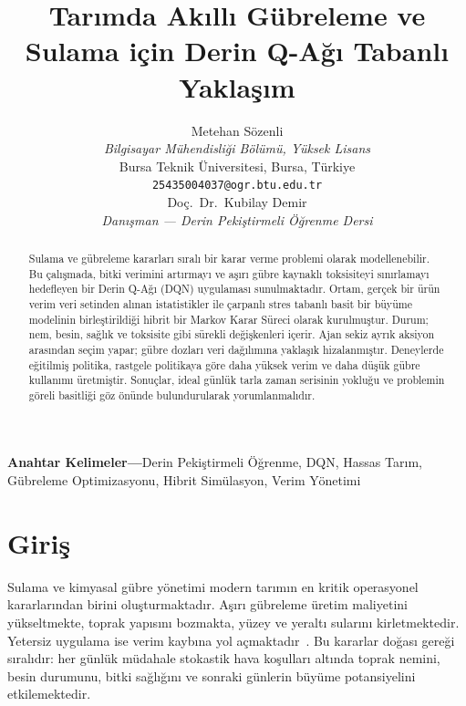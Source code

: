 \documentclass[10pt,twocolumn,a4paper]{article}
\begin{document}
\title{\vspace{-0.6em}\textbf{Tar{\i}mda Ak{\i}ll{\i} G\"ubreleme ve Sulama i\c{c}in Derin Q-A\u{g}{\i} Tabanl{\i} Yakla\c{s}{\i}m}}

\author{
Metehan S\"ozenli\\
\textit{Bilgisayar M\"uhendisli\u{g}i B\"ol\"um\"u, Y\"uksek Lisans}\\
Bursa Teknik \"Universitesi, Bursa, T\"urkiye\\
\texttt{25435004037@ogr.btu.edu.tr}\\[0.35em]
Do\c{c}.~Dr.~Kubilay Demir\\
\textit{Dan{\i}\c{s}man --- Derin Peki\c{s}tirmeli \"O\u{g}renme Dersi}
}

\date{}
\maketitle
\thispagestyle{fancy}

\begin{abstract}
\noindent
Sulama ve g\"ubreleme kararlar{\i} s{\i}ral{\i} bir karar verme problemi olarak modellenebilir. Bu \c{c}al{\i}\c{s}mada, bitki verimini art{\i}rmay{\i} ve a\c{s}{\i}r{\i} g\"ubre kaynakl{\i} toksisiteyi s{\i}n{\i}rlamay{\i} hedefleyen bir Derin Q-A\u{g}{\i} (DQN) uygulamas{\i} sunulmaktad{\i}r. Ortam, ger\c{c}ek bir \"ur\"un verim veri setinden al{\i}nan istatistikler ile \c{c}arpanl{\i} stres tabanl{\i} basit bir b\"uy\"ume modelinin birle\c{s}tirildi\u{g}i hibrit bir Markov Karar S\"ureci olarak kurulmu\c{s}tur. Durum; nem, besin, sa\u{g}l{\i}k ve toksisite gibi s\"urekli de\u{g}i\c{s}kenleri i\c{c}erir. Ajan sekiz ayr{\i}k aksiyon aras{\i}ndan se\c{c}im yapar; g\"ubre dozlar{\i} veri da\u{g}{\i}l{\i}m{\i}na yakla\c{s}{\i}k hizalanm{\i}\c{s}t{\i}r. Deneylerde e\u{g}itilmi\c{s} politika, rastgele politikaya g\"ore daha y\"uksek verim ve daha d\"u\c{s}\"uk g\"ubre kullan{\i}m{\i} \"uretmi\c{s}tir. Sonu\c{c}lar, ideal g\"unl\"uk tarla zaman serisinin yoklu\u{g}u ve problemin g\"oreli basitli\u{g}i g\"oz \"on\"unde bulundurularak yorumlanmal{\i}d{\i}r.
\end{abstract}

\begin{center}
\small\textbf{Anahtar Kelimeler---}Derin Peki\c{s}tirmeli \"O\u{g}renme, DQN, Hassas Tar{\i}m, G\"ubreleme Optimizasyonu, Hibrit Sim\"ulasyon, Verim Y\"onetimi
\end{center}

\section{Giri\c{s}}
Sulama ve kimyasal g\"ubre y\"onetimi modern tar{\i}m{\i}n en kritik operasyonel kararlar{\i}ndan birini olu\c{s}turmaktad{\i}r. A\c{s}{\i}r{\i} g\"ubreleme \"uretim maliyetini y\"ukseltmekte, toprak yap{\i}s{\i}n{\i} bozmakta, y\"uzey ve yeralt{\i} sular{\i}n{\i} kirletmektedir. Yetersiz uygulama ise verim kayb{\i}na yol a\c{c}maktad{\i}r~\cite{tilman2002agricultural}. Bu kararlar do\u{g}as{\i} gere\u{g}i s{\i}ral{\i}d{\i}r: her g\"unl\"uk m\"udahale stokastik hava ko\c{s}ullar{\i} alt{\i}nda toprak nemini, besin durumunu, bitki sa\u{g}l{\i}\u{g}{\i}n{\i} ve sonraki g\"unlerin b\"uy\"ume potansiyelini etkilemektedir.
\end{document}
